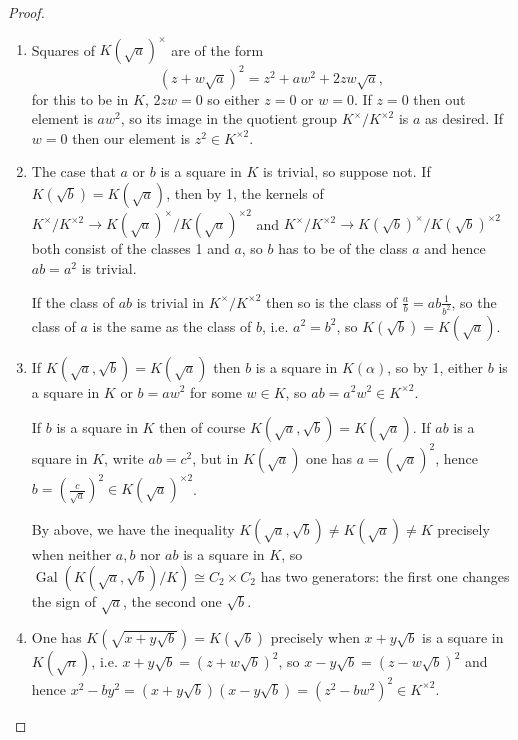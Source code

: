\documentclass{article}
\newcommand{\Gal}{\operatorname{Gal}}
\theoremstyle{definition}
\begin{document}
\begin{proof}
\begin{enumerate}
\item Squares of $K\left(\sqrt a\right)^\times$ are of the form
\[
\left(z+w\sqrt a\right)^2=z^2+aw^2+2zw\sqrt a,
\]
for this to be in $K$, $2zw=0$ so either $z=0$ or $w=0$. If $z=0$ then out element is $aw^2$, so its image in the quotient group $K^\times/K^{\times 2}$ is $a$ as desired. If $w=0$ then our element is $z^2\in K^{\times 2}$.
\item The case that $a$ or $b$ is a square in $K$ is trivial, so suppose not. If $K\left(\sqrt b\right)=K\left(\sqrt a\right)$, then by 1, the kernels of $K^\times/K^{\times 2} \rightarrow K\left(\sqrt a\right)^\times/K\left(\sqrt a\right)^{\times 2}$ and $K^\times/K^{\times 2} \rightarrow K\left(\sqrt b\right)^\times/K\left(\sqrt b\right)^{\times 2}$ both consist of the classes 1 and $a$, so $b$ has to be of the class $a$ and hence $ab=a^2$ is trivial.

If the class of $ab$ is trivial in $K^\times/K^{\times 2}$ then so is the class of $\frac{a}{b}=ab\frac{1}{b^2}$, so the class of $a$ is the same as the class of $b$, i.e. $a^2=b^2$, so $K\left(\sqrt b\right)=K\left(\sqrt a\right)$.
\item If $K\left(\sqrt a,\sqrt b\right)=K\left(\sqrt a\right)$ then $b$ is a square in $K(\alpha)$, so by 1, either $b$ is a square in $K$ or $b=aw^2$ for some $w\in K$, so $ab=a^2w^2\in K^{\times 2}$.

If $b$ is a square in $K$ then of course $K\left(\sqrt a,\sqrt b\right)=K\left(\sqrt a\right)$. If $ab$ is a square in $K$, write $ab=c^2$, but in $K\left(\sqrt a\right)$ one has $a=\left(\sqrt a\right)^2$, hence $b=\left(\frac{c}{\sqrt a}\right)^2\in K\left(\sqrt a\right)^{\times 2}$.

By above, we have the inequality $K\left(\sqrt a,\sqrt b\right)\neq K\left(\sqrt a\right)\neq K$ precisely when neither $a,b$ nor $ab$ is a square in $K$, so $\Gal\left(K\left(\sqrt a,\sqrt b\right)/K\right)\cong C_2\times C_2$ has two generators: the first one changes the sign of $\sqrt a$, the second one $\sqrt b$.
\item One has $K\left(\sqrt{x+y\sqrt b}\right)=K\left(\sqrt b\right)$ precisely when $x+y\sqrt b$ is a square in $K\left(\sqrt n\right)$, i.e. $x+y\sqrt b=\left(z+w\sqrt b\right)^2$, so $x-y\sqrt b=\left(z-w\sqrt b\right)^2$ and hence $x^2-by^2=\left(x+y\sqrt b\right)\left(x-y\sqrt b\right)=\left(z^2-bw^2\right)^2\in K^{\times 2}$.
\end{enumerate}
\end{proof}
\end{document}
